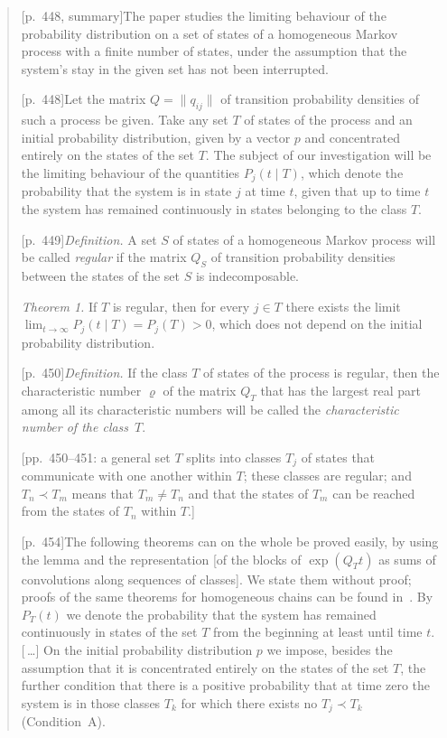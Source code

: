 \documentclass[11pt]{article}
\theoremstyle{definition}
\theoremstyle{remark}
\begin{document}
\begin{quote}\small
[p.~448, summary]\enspace The paper studies the limiting behaviour of the probability
distribution on a set of states of a homogeneous Markov process with a finite number of states,
under the assumption that the system's stay in the given set has not been interrupted.

[p.~448]\enspace Let the matrix $Q = \|q_{ij}\|$ of transition probability densities of such a
process be given. Take any set $T$ of states of the process and an initial probability
distribution, given by a vector $p$ and concentrated entirely on the states of the set $T$. The
subject of our investigation will be the limiting behaviour of the quantities $P_j(t \mid T)$,
which denote the probability that the system is in state $j$ at time $t$, given that up to
time $t$ the system has remained continuously in states belonging to the class $T$.

[p.~449]\enspace \emph{Definition.} A set $S$ of states of a homogeneous Markov process will be
called \emph{regular} if the matrix $Q_S$ of transition probability densities between the states
of the set $S$ is indecomposable.

\emph{Theorem 1.} If $T$ is regular, then for every $j \in T$ there exists the limit
$\lim_{t\to\infty} P_j(t \mid T) = P_j(T) > 0$, which does not depend on the initial probability
distribution.

[p.~450]\enspace \emph{Definition.} If the class $T$ of states of the process is regular, then
the characteristic number $\varrho$ of the matrix $Q_T$ that has the largest real part among all
its characteristic numbers will be called the \emph{characteristic number of the class}~$T$.

[pp.~450--451: a general set $T$ splits into classes $T_j$ of states that communicate with one
another within $T$; these classes are regular; and $T_n \prec T_m$ means that $T_m \ne T_n$ and
that the states of $T_m$ can be reached from the states of $T_n$ within $T$.]

[p.~454]\enspace The following theorems can on the whole be proved easily, by using the lemma
and the representation [of the blocks of $\exp(Q_T t)$ as sums of convolutions along sequences
of classes]. We state them without proof; proofs of the same theorems for homogeneous chains can
be found in~\cite{Mandl59}. By $P_T(t)$ we denote the probability that the system has remained
continuously in states of the set $T$ from the beginning at least until time $t$. [\,\dots] On
the initial probability distribution $p$ we impose, besides the assumption that it is
concentrated entirely on the states of the set $T$, the further condition that there is a
positive probability that at time zero the system is in those classes $T_k$ for which there
exists no $T_j \prec T_k$ (Condition~A).


\end{quote}
\end{document}

